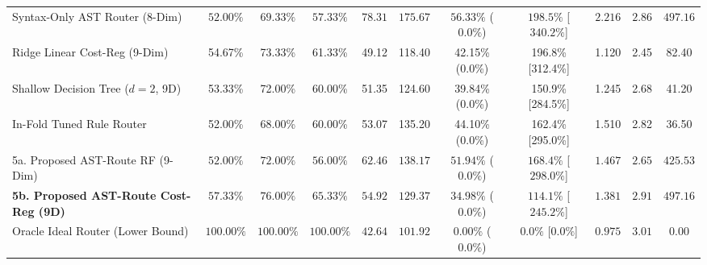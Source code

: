 \documentclass[10pt,a4paper]{article}
\newenvironment{fitasttable}{%
  \begin{lrbox}{\asttblbox}%
}{%
  \end{lrbox}%
  \sbox{\asttblboxB}{%
    \ifdim\wd\asttblbox>0.96\textwidth
      \resizebox{0.96\textwidth}{!}{\usebox{\asttblbox}}%
    \else
      \usebox{\asttblbox}%
    \fi
  }%
  \ifdim\ht\asttblboxB>0.72\textheight
    \resizebox{!}{0.72\textheight}{\usebox{\asttblboxB}}%
  \else
    \usebox{\asttblboxB}%
  \fi
}
\begin{document}
\begin{table}[!htbp]
\begin{fitasttable}
\begin{tabular}{@{}lcccccccccc@{}}
Syntax-Only AST Router (8-Dim) & $52.00\%$ & $69.33\%$ & $57.33\%$ & $78.31$ & $175.67$ & $56.33\%$ ($0.0\%$) & $198.5\%$ [$340.2\%$] & $2.216$ & $2.86$ & $497.16$ \\
Ridge Linear Cost-Reg (9-Dim) & 54.67\% & 73.33\% & 61.33\% & 49.12 & 118.40 & 42.15\% (0.0\%) & 196.8\% [312.4\%] & 1.120 & 2.45 & 82.40 \\
Shallow Decision Tree ($d=2$, 9D) & 53.33\% & 72.00\% & 60.00\% & 51.35 & 124.60 & 39.84\% (0.0\%) & 150.9\% [284.5\%] & 1.245 & 2.68 & 41.20 \\
In-Fold Tuned Rule Router & 52.00\% & 68.00\% & 60.00\% & 53.07 & 135.20 & 44.10\% (0.0\%) & 162.4\% [295.0\%] & 1.510 & 2.82 & 36.50 \\
5a. Proposed AST-Route RF (9-Dim) & $52.00\%$ & $72.00\%$ & $56.00\%$ & $62.46$ & $138.17$ & $51.94\%$ ($0.0\%$) & $168.4\%$ [$298.0\%$] & $1.467$ & $2.65$ & $425.53$ \\
\textbf{5b. Proposed AST-Route Cost-Reg (9D)} & $\mathbf{57.33\%}$ & $\mathbf{76.00\%}$ & $\mathbf{65.33\%}$ & $\mathbf{54.92}$ & $\mathbf{129.37}$ & $\mathbf{34.98\%}$ ($\mathbf{0.0\%}$) & $\mathbf{114.1\%}$ [$\mathbf{245.2\%}$] & $\mathbf{1.381}$ & $\mathbf{2.91}$ & $\mathbf{497.16}$ \\
Oracle Ideal Router (Lower Bound) & $100.00\%$ & $100.00\%$ & $100.00\%$ & $42.64$ & $101.92$ & $0.00\%$ ($0.0\%$) & $0.0\%$ [$0.0\%$] & $0.975$ & $3.01$ & $0.00$ \\
\bottomrule

\end{tabular}
\end{fitasttable}
\end{table}
\end{document}
